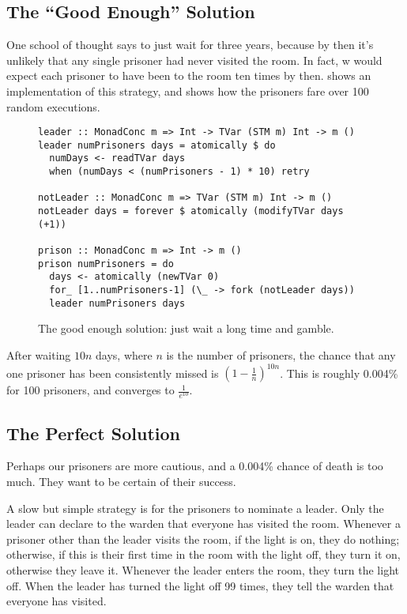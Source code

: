 \subsection{The ``Good Enough'' Solution}

One school of thought says to just wait for three years, because by
then it's unlikely that any single prisoner had never visited the
room.  In fact, w would expect each prisoner to have been to the room
ten times by then.   shows an implementation of this
strategy, and  shows how the prisoners fare over 100
random executions.

\begin{figure}[t]
  \centering
  \begin{lstlisting}
leader :: MonadConc m => Int -> TVar (STM m) Int -> m ()
leader numPrisoners days = atomically $ do
  numDays <- readTVar days
  when (numDays < (numPrisoners - 1) * 10) retry

notLeader :: MonadConc m => TVar (STM m) Int -> m ()
notLeader days = forever $ atomically (modifyTVar days (+1))

prison :: MonadConc m => Int -> m ()
prison numPrisoners = do
  days <- atomically (newTVar 0)
  for_ [1..numPrisoners-1] (\_ -> fork (notLeader days))
  leader numPrisoners days
  \end{lstlisting}
  \caption{The good enough solution: just wait a long time and gamble.}
  \label{fig:100good}
\end{figure}

After waiting $10 n$ days, where $n$ is the number of prisoners, the
chance that any one prisoner has been consistently missed is
$\left(1 - \frac{1}{n}\right)^{10n}$.  This is roughly 0.004\% for 100
prisoners, and converges to $\frac{1}{e^{10}}$.

\subsection{The Perfect Solution}

Perhaps our prisoners are more cautious, and a 0.004\% chance of death
is too much.  They want to be certain of their success.

A slow but simple strategy is for the prisoners to nominate a leader.
Only the leader can declare to the warden that everyone has visited
the room.  Whenever a prisoner other than the leader visits the room,
if the light is on, they do nothing; otherwise, if this is their first
time in the room with the light off, they turn it on, otherwise they
leave it.  Whenever the leader enters the room, they turn the light
off.  When the leader has turned the light off 99 times, they tell the
warden that everyone has visited.

